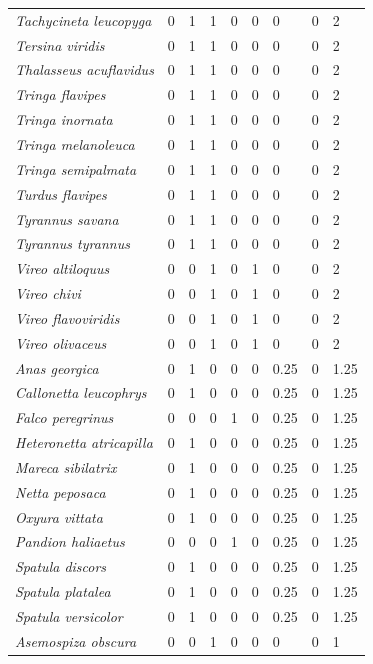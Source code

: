 \documentclass[
  oneside]{scrbook}
\begin{document}
\begin{longtable}[t]{>{}lrrrrrlrl}
\em{Tachycineta leucopyga} & 0 & 1 & 1 & 0 & 0 & 0 & 0 & 2\\
\em{Tersina viridis} & 0 & 1 & 1 & 0 & 0 & 0 & 0 & 2\\
\addlinespace
\em{Thalasseus acuflavidus} & 0 & 1 & 1 & 0 & 0 & 0 & 0 & 2\\
\em{Tringa flavipes} & 0 & 1 & 1 & 0 & 0 & 0 & 0 & 2\\
\em{Tringa inornata} & 0 & 1 & 1 & 0 & 0 & 0 & 0 & 2\\
\em{Tringa melanoleuca} & 0 & 1 & 1 & 0 & 0 & 0 & 0 & 2\\
\em{Tringa semipalmata} & 0 & 1 & 1 & 0 & 0 & 0 & 0 & 2\\
\addlinespace
\em{Turdus flavipes} & 0 & 1 & 1 & 0 & 0 & 0 & 0 & 2\\
\em{Tyrannus savana} & 0 & 1 & 1 & 0 & 0 & 0 & 0 & 2\\
\em{Tyrannus tyrannus} & 0 & 1 & 1 & 0 & 0 & 0 & 0 & 2\\
\em{Vireo altiloquus} & 0 & 0 & 1 & 0 & 1 & 0 & 0 & 2\\
\em{Vireo chivi} & 0 & 0 & 1 & 0 & 1 & 0 & 0 & 2\\
\addlinespace
\em{Vireo flavoviridis} & 0 & 0 & 1 & 0 & 1 & 0 & 0 & 2\\
\em{Vireo olivaceus} & 0 & 0 & 1 & 0 & 1 & 0 & 0 & 2\\
\em{Anas georgica} & 0 & 1 & 0 & 0 & 0 & 0.25 & 0 & 1.25\\
\em{Callonetta leucophrys} & 0 & 1 & 0 & 0 & 0 & 0.25 & 0 & 1.25\\
\em{Falco peregrinus} & 0 & 0 & 0 & 1 & 0 & 0.25 & 0 & 1.25\\
\addlinespace
\em{Heteronetta atricapilla} & 0 & 1 & 0 & 0 & 0 & 0.25 & 0 & 1.25\\
\em{Mareca sibilatrix} & 0 & 1 & 0 & 0 & 0 & 0.25 & 0 & 1.25\\
\em{Netta peposaca} & 0 & 1 & 0 & 0 & 0 & 0.25 & 0 & 1.25\\
\em{Oxyura vittata} & 0 & 1 & 0 & 0 & 0 & 0.25 & 0 & 1.25\\
\em{Pandion haliaetus} & 0 & 0 & 0 & 1 & 0 & 0.25 & 0 & 1.25\\
\addlinespace
\em{Spatula discors} & 0 & 1 & 0 & 0 & 0 & 0.25 & 0 & 1.25\\
\em{Spatula platalea} & 0 & 1 & 0 & 0 & 0 & 0.25 & 0 & 1.25\\
\em{Spatula versicolor} & 0 & 1 & 0 & 0 & 0 & 0.25 & 0 & 1.25\\
\em{Asemospiza obscura} & 0 & 0 & 1 & 0 & 0 & 0 & 0 & 1\\

\end{longtable}
\end{document}
